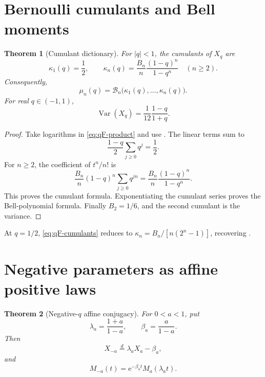 \documentclass[11pt,oneside,openany]{book}
\newtheorem{theorem}{Theorem}[chapter]
\theoremstyle{definition}
\theoremstyle{remark}
\newcommand{\e}{\mathrm e}
\begin{document}
\section{Bernoulli cumulants and Bell moments}

\begin{theorem}[Cumulant dictionary]\label{thm:qF-cumulants}
For $|q|<1$, the cumulants of $X_q$ are
\begin{equation}\label{eq:qF-cumulants}
 \boxed{
 \kappa_1(q)=\frac12,
 \qquad
 \kappa_n(q)=\frac{B_n}{n}\frac{(1-q)^n}{1-q^n}
 \quad(n\ge2).}
\end{equation}
Consequently,
\begin{equation}\label{eq:qF-Bell}
 \boxed{
 \mu_n(q)=\mathcal B_n\bigl(\kappa_1(q),\ldots,\kappa_n(q)\bigr).}
\end{equation}
For real $q\in(-1,1)$,
\begin{equation}\label{eq:qF-variance}
 \operatorname{Var}(X_q)=\frac1{12}\frac{1-q}{1+q}.
\end{equation}
\end{theorem}

\begin{proof}
Take logarithms in \eqref{eq:qF-product} and use
.  The linear terms sum to
\[
 \frac{1-q}{2}\sum_{j\ge0}q^j=\frac12.
\]
For $n\ge2$, the coefficient of $t^n/n!$ is
\[
 \frac{B_n}{n}(1-q)^n\sum_{j\ge0}q^{jn}
 =\frac{B_n}{n}\frac{(1-q)^n}{1-q^n}.
\]
This proves the cumulant formula.  Exponentiating the cumulant series proves
the Bell-polynomial formula.  Finally $B_2=1/6$, and the second cumulant is
the variance.
\end{proof}

At $q=1/2$, \eqref{eq:qF-cumulants} reduces to
$\kappa_n=B_n/[n(2^n-1)]$, recovering
.

\section{Negative parameters as affine positive laws}

\begin{theorem}[Negative-$q$ affine conjugacy]\label{thm:qF-negative-affine}
For $0<a<1$, put
\begin{equation}\label{eq:qF-lambda-beta}
 \lambda_a=\frac{1+a}{1-a},
 \qquad
 \beta_a=\frac a{1-a}.
\end{equation}
Then
\begin{equation}\label{eq:qF-negative-affine}
 \boxed{X_{-a}\overset d=\lambda_aX_a-\beta_a,}
\end{equation}
and
\begin{equation}\label{eq:qF-negative-MGF}
 \boxed{M_{-a}(t)=\e^{-\beta_at}M_a(\lambda_at).}
\end{equation}
\end{theorem}
\end{document}
